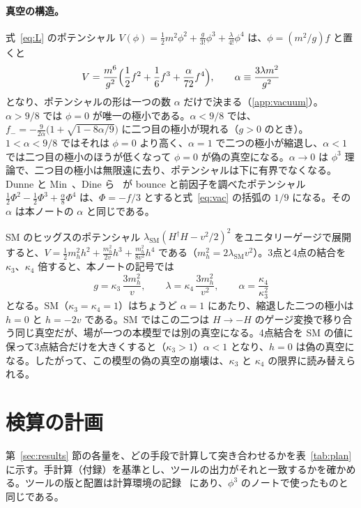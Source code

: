 \documentclass[a4paper,10pt]{ltjsarticle}
\begin{document}
\paragraph{真空の構造。}式~\eqref{eq:L} のポテンシャル $V(\phi)=\frac12m^2\phi^2+\frac{g}{3!}\phi^3+\frac{\lambda}{4!}\phi^4$ は、$\phi=(m^2/g)f$ と置くと
\begin{equation}
V=\frac{m^6}{g^2}\Bigl(\frac12f^2+\frac16f^3+\frac{\alpha}{72}f^4\Bigr),\qquad
\alpha\equiv\frac{3\lambda m^2}{g^2}
\label{eq:vac}
\end{equation}
となり、ポテンシャルの形は一つの数 $\alpha$ だけで決まる（\ref{app:vacuum}）。$\alpha>9/8$ では $\phi=0$ が唯一の極小である。$\alpha<9/8$ では、$f_-=-\frac{9}{2\alpha}\bigl(1+\sqrt{1-8\alpha/9}\bigr)$ に二つ目の極小が現れる（$g>0$ のとき）。$1<\alpha<9/8$ ではそれは $\phi=0$ より高く、$\alpha=1$ で二つの極小が縮退し、$\alpha<1$ では二つ目の極小のほうが低くなって $\phi=0$ が偽の真空になる。$\alpha\to0$ は $\phi^3$ 理論で、二つ目の極小は無限遠に去り、ポテンシャルは下に有界でなくなる。Dunne と Min~\cite{dunnemin}、Dine ら~\cite{dine92} が bounce と前因子を調べたポテンシャル $\frac12\Phi^2-\frac12\Phi^3+\frac\alpha8\Phi^4$ は、$\Phi=-f/3$ とすると式~\eqref{eq:vac} の括弧の $1/9$ になる。その $\alpha$ は本ノートの $\alpha$ と同じである。

SM のヒッグスのポテンシャル $\lambda_{\mathrm{SM}}(H^\dagger H-v^2/2)^2$ をユニタリーゲージで展開すると、$V=\frac12m_h^2h^2+\frac{m_h^2}{2v}h^3+\frac{m_h^2}{8v^2}h^4$ である（$m_h^2=2\lambda_{\mathrm{SM}}v^2$）。3点と4点の結合を $\kappa_3$、$\kappa_4$ 倍すると、本ノートの記号では
\begin{equation}
g=\kappa_3\,\frac{3m_h^2}{v},\qquad\lambda=\kappa_4\,\frac{3m_h^2}{v^2},\qquad\alpha=\frac{\kappa_4}{\kappa_3^2}
\label{eq:kappa}
\end{equation}
となる。SM（$\kappa_3=\kappa_4=1$）はちょうど $\alpha=1$ にあたり、縮退した二つの極小は $h=0$ と $h=-2v$ である。SM ではこの二つは $H\to-H$ のゲージ変換で移り合う同じ真空だが、場が一つの本模型では別の真空になる。4点結合を SM の値に保って3点結合だけを大きくすると（$\kappa_3>1$）$\alpha<1$ となり、$h=0$ は偽の真空になる。したがって、この模型の偽の真空の崩壊は、$\kappa_3$ と $\kappa_4$ の限界に読み替えられる。

\section{検算の計画}\label{sec:plan}

第~\ref{sec:results} 節の各量を、どの手段で計算して突き合わせるかを表~\ref{tab:plan} に示す。手計算（付録）を基準とし、ツールの出力がそれと一致するかを確かめる。ツールの版と配置は計算環境の記録~\cite{env} にあり、$\phi^3$ のノートで使ったものと同じである。
\end{document}
